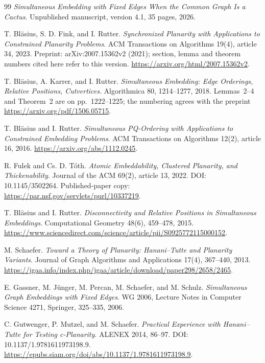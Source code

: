 \begin{thebibliography}{99}
\emph{Simultaneous Embedding with Fixed Edges When the Common Graph Is a
Cactus}. Unpublished manuscript, version 4.1, 35 pages, 2026.

T. Bl\"asius, S. D. Fink, and I. Rutter.
\emph{Synchronized Planarity with Applications to Constrained Planarity
Problems}. ACM Transactions on Algorithms 19(4), article 34, 2023.
Preprint: arXiv:2007.15362v2 (2021); section, lemma and theorem numbers
cited here refer to this version.
\url{https://arxiv.org/html/2007.15362v2}.

T. Bl\"asius, A. Karrer, and I. Rutter.
\emph{Simultaneous Embedding: Edge Orderings, Relative Positions, Cutvertices}.
Algorithmica 80, 1214--1277, 2018. Lemmas~2--4 and Theorem~2 are on
pp.~1222--1225; the numbering agrees with the preprint
\url{https://arxiv.org/pdf/1506.05715}.

T. Bl\"asius and I. Rutter.
\emph{Simultaneous PQ-Ordering with Applications to Constrained Embedding
Problems}. ACM Transactions on Algorithms 12(2), article 16, 2016.
\url{https://arxiv.org/abs/1112.0245}.

R. Fulek and Cs. D. T\'oth.
\emph{Atomic Embeddability, Clustered Planarity, and Thickenability}.
Journal of the ACM 69(2), article 13, 2022. DOI: 10.1145/3502264.
Published-paper copy: \url{https://par.nsf.gov/servlets/purl/10337219}.

T. Bl\"asius and I. Rutter.
\emph{Disconnectivity and Relative Positions in Simultaneous Embeddings}.
Computational Geometry 48(6), 459--478, 2015.
\url{https://www.sciencedirect.com/science/article/pii/S0925772115000152}.

M. Schaefer.
\emph{Toward a Theory of Planarity: Hanani--Tutte and Planarity Variants}.
Journal of Graph Algorithms and Applications 17(4), 367--440, 2013.
\url{https://jgaa.info/index.php/jgaa/article/download/paper298/2658/2465}.

E. Gassner, M. J\"unger, M. Percan, M. Schaefer, and M. Schulz.
\emph{Simultaneous Graph Embeddings with Fixed Edges}.
WG 2006, Lecture Notes in Computer Science 4271, Springer, 325--335, 2006.

C. Gutwenger, P. Mutzel, and M. Schaefer.
\emph{Practical Experience with Hanani--Tutte for Testing c-Planarity}.
ALENEX 2014, 86--97. DOI: 10.1137/1.9781611973198.9.
\url{https://epubs.siam.org/doi/abs/10.1137/1.9781611973198.9}.


\end{thebibliography}
